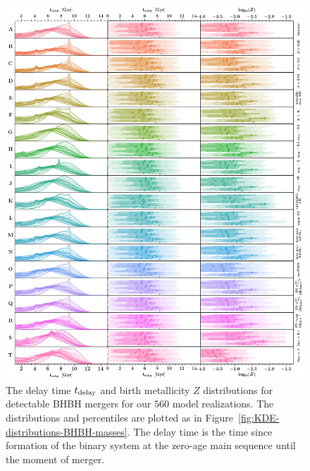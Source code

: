 \documentclass[fleqn,usenatbib]{mnras}
\newcommand{\Zi}{\ensuremath{Z}\xspace}
\newcommand{\tdelay}{\ensuremath{{t}_{\rm{delay}}}\xspace}
\newcommand{\Nmodels}{\ensuremath{560}\xspace}
\begin{document}
\begin{figure}
    \centering
\includegraphics[width=1\textwidth]{figures/KDEplot_time_metallicity_det_BBH.png} %
\caption{The delay time  $\tdelay$ and birth metallicity \Zi distributions for detectable BHBH mergers for our \Nmodels model realizations. The distributions and percentiles are plotted as in Figure~\ref{fig:KDE-distributions-BHBH-masses}. The delay time is the time since formation of the binary system at the zero-age main sequence until the moment of merger. \href{https://github.com/FloorBroekgaarden/Double-Compact-Object-Mergers/blob/main/plottingCode/Fig_7_and_Fig_8_and_Fig_9/KDEplot_time_metallicity_det_BBH.png}{\faFileImage} \href{https://github.com/FloorBroekgaarden/Double-Compact-Object-Mergers/blob/main/plottingCode/Fig_7_and_Fig_8_and_Fig_9/make_Fig_7_and_Fig_8_and_Fig_9.ipynb}{\faBook}}
    \label{fig:KDE-distributions-BHBH-delay-times}
\end{figure}
\end{document}
